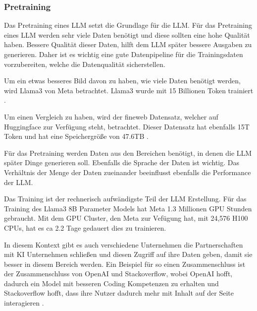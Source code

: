 \subsubsection{Pretraining}
Das Pretraining eines LLM setzt die Grundlage für die LLM.
Für das Pretraining eines LLM werden sehr viele Daten benötigt 
und diese sollten eine hohe Qualität haben. Bessere Qualität 
dieser Daten, hilft dem LLM später bessere Ausgaben zu generieren.
Daher ist es wichtig eine gute Datenpipeline für die Trainingsdaten
vorzubereiten, welche die Datenqualität sicherstellen. \cite{craigPretrainingLasso2024,IntroducingMetaLlama}\par
Um ein etwas besseres Bild davon zu haben, wie viele Daten benötigt werden, 
 wird Llama3 von Meta 
betrachtet. Llama3 wurde mit 15 Billionen Token trainiert \cite{IntroducingMetaLlama}. \par
Um einen Vergleich zu haben, wird der fineweb Datensatz, welcher 
auf Huggingface zur Verfügung steht, betrachtet. 
Dieser Datensatz hat ebenfalls 15T Token und hat eine Speichergröße
von 47.6TB \cite{penedo2024finewebdatasetsdecantingweb}. \par
Für das Pretraining werden Daten aus den Bereichen benötigt, in denen 
die LLM später Dinge generieren soll. Ebenfalls die Sprache der Daten
ist wichtig. Das Verhältnis der Menge der 
Daten zueinander beeinflusst ebenfalls die Performance der 
LLM. \par
Das Training ist der rechnerisch aufwändigste Teil der LLM 
Erstellung. Für das Training des Llama3 8B Parameter Models hat 
Meta 1.3 Millionen GPU Stunden gebraucht. Mit dem GPU Cluster, 
den Meta zur Vefügung hat, mit 24,576 H100 CPUs, hat es ca 2.2 Tage
gedauert dies zu trainieren.\cite{Llama3MODEL_CARDMd, IntroducingMetaLlama, BuildingMetaGenAI2024}\par
In diesem Kontext gibt es auch verschiedene Unternehmen die Partnerschaften
mit KI Unternehmen schließen und diesen Zugriff auf ihre Daten geben, damit
sie besser in diesem Bereich werden. Ein Beispiel für so einen Zusammenschluss
ist der Zusammenschluss von OpenAI und Stackoverflow, wobei OpenAI hofft, dadurch 
ein Model mit besseren Coding Kompetenzen zu erhalten und Stackoverflow
hofft, dass ihre Nutzer dadurch mehr mit Inhalt auf der Seite interagieren \cite{StackOverflowOpenAI}. 

